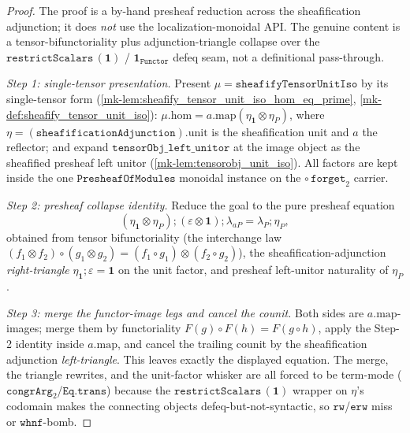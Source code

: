 \begin{proof}
  \leanok
  The proof is a by-hand presheaf reduction across the sheafification adjunction; it does \emph{not}
  use the localization-monoidal API. The genuine content is a tensor-bifunctoriality plus
  adjunction-triangle collapse over the \(\mathtt{restrictScalars}\,(\mathbf 1)\) / \(\mathbf 1_{\mathtt{Functor}}\)
  defeq seam, not a definitional pass-through.

  \emph{Step 1: single-tensor presentation.} Present
  \(\mu = \mathtt{sheafifyTensorUnitIso}\) by its single-tensor form
  (\ref{mk-lem:sheafify_tensor_unit_iso_hom_eq_prime}, \ref{mk-def:sheafify_tensor_unit_iso}):
  \(\mu.\mathrm{hom} = a.\mathrm{map}(\eta_{\mathbf 1} \otimes \eta_P)\), where
  \(\eta = (\mathtt{sheafificationAdjunction}).\mathrm{unit}\) is the sheafification unit and \(a\) the
  reflector; and expand \(\mathtt{tensorObj\_left\_unitor}\) at the image object as the sheafified
  presheaf left unitor (\ref{mk-lem:tensorobj_unit_iso}). All factors are kept inside the one
  \(\mathtt{PresheafOfModules}\) monoidal instance on the \(\circ\,\mathtt{forget}_2\) carrier.

  \emph{Step 2: presheaf collapse identity.} Reduce the goal to the pure presheaf equation
  \[
    (\eta_{\mathbf 1} \otimes \eta_P) \mathbin{;} (\varepsilon \otimes \mathbf 1) \mathbin{;} \lambda_{aP}
      = \lambda_P \mathbin{;} \eta_P ,
  \]
  obtained from tensor bifunctoriality (the interchange law
  \((f_1\otimes f_2)\circ(g_1\otimes g_2) = (f_1\circ g_1)\otimes(f_2\circ g_2)\)), the
  sheafification-adjunction \emph{right-triangle} \(\eta_{\mathbf 1}\mathbin{;}\varepsilon = \mathbf 1\)
  on the unit factor, and presheaf left-unitor naturality of \(\eta_P\).

  \emph{Step 3: merge the functor-image legs and cancel the counit.} Both sides are
  \(a.\mathrm{map}\)-images; merge them by functoriality \(F(g)\circ F(h)=F(g\circ h)\), apply the
  Step-2 identity inside \(a.\mathrm{map}\), and cancel the trailing counit by the sheafification
  adjunction \emph{left-triangle}. This leaves exactly the displayed equation. The merge, the
  triangle rewrites, and the unit-factor whisker are all forced to be term-mode
  (\(\mathtt{congrArg}_2\)/\(\mathtt{Eq.trans}\)) because the \(\mathtt{restrictScalars}\,(\mathbf 1)\)
  wrapper on \(\eta\)'s codomain makes the connecting objects defeq-but-not-syntactic, so
  \(\mathtt{rw}\)/\(\mathtt{erw}\) miss or \(\mathtt{whnf}\)-bomb.
\end{proof}

